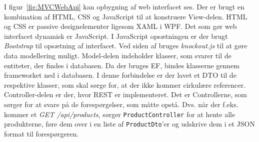 I figur~\ref{fig:MVCWebApi} kan opbygning af web interfacet ses. 
Der er brugt en kombination af HTML, CSS og JavaScript til at konstruere View-delen. HTML og CSS er passive designelementer ligesom \gls{XAML} i \gls{WPF}. Det som gør web interfacet dynamisk er JavaScript. I JavaScript opsætningen er der brugt \textit{Bootstrap} til opsætning af interfacet. Ved siden af bruges \textit{knockout.js} til at gøre data modellering muligt.
\newline\newline
Model-delen indeholder klasser, som svarer til de entiteter, der findes i databasen. Da der bruges \gls{EF}, bindes klasserne gennem frameworket ned i databasen. I denne forbindelse er der lavet et \gls{DTO} til de respektive klasser, som skal sørge for, at der ikke kommer cirkulære referencer. 
\newline\newline
Controller-delen er der, hvor \gls{REST} er implementeret. Det er Controllerne, som sørger for at svare på de forespørgelser, som måtte opstå. Dvs. når der f.eks. kommer et \textit{GET /api/products}, sørger \texttt{ProductController} for at hente alle produkterne, føre dem over i en liste af \texttt{ProductDto}'er og udskrive dem i et JSON format til forespørgeren.